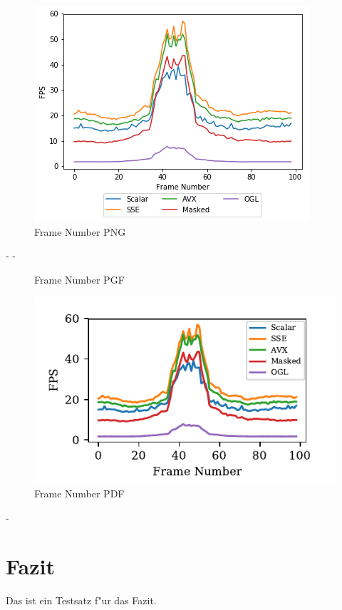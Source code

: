 \documentclass[journal]{vgtc}
\begin{document}
\newpage
\begin{figure}
	\centering
	\begin{minipage}{0.5\textwidth}	
		\includegraphics[width=\textwidth]{images/Evaluation_1_Results_FPS.png}
		\caption{Frame Number PNG}
	\end{minipage}
\end{figure}

-
\newpage
-
	
\begin{figure}
	\begin{minipage}{0.5\textwidth}
		
		\caption{Frame Number PGF}
	\end{minipage}
\end{figure}

\begin{figure}
	\begin{minipage}{\textwidth}
		\includegraphics[width=\textwidth]{images/Evaluation_1_Results_FPS.pdf}
		\caption{Frame Number PDF}
	\end{minipage}
\end{figure}

\newpage
-
\section{Fazit}
Das ist ein Testsatz f"ur das Fazit.

 

\end{document}
